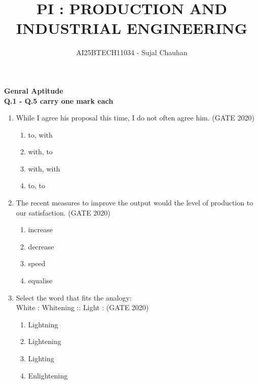 \documentclass[journal,12pt,onecolumn]{IEEEtran}
\theoremstyle{remark}
\begin{document}
\title{PI : PRODUCTION AND INDUSTRIAL ENGINEERING}
\author{AI25BTECH11034 - Sujal Chauhan}
\maketitle
\renewcommand{\thefigure}{\theenumi}
\renewcommand{\thetable}{\theenumi}
\textbf{\Large Genral Aptitude } \\
\vspace{1cm}
\textbf{\large Q.1 - Q.5 carry one mark each}
\begin{enumerate}
\item While I agree \underline{\hspace{2cm}} his proposal this time, I do not often agree  him.
\hfill{(GATE 2020)}
\begin{multicols}{4}
\begin{enumerate}
    \item to, with
    \item with, to
    \item with, with
    \item to, to
\end{enumerate}
\end{multicols}
\vspace{1cm}

\item The recent measures to improve the output would \underline{\hspace{2cm}}the level of production to our satisfaction.
\hfill{(GATE 2020)}
\begin{multicols}{4}
\begin{enumerate}
    \item increase
    \item decrease
    \item speed
    \item equalise
\end{enumerate}
\end{multicols}
\vspace{1cm}

\item Select the word that fits the analogy: \\
White : Whitening :: Light : \underline{\hspace{2cm}}  
\hfill{(GATE 2020)}
\begin{enumerate}
    \item Lightning
    \item Lightening
    \item Lighting
    \item Enlightening
\end{enumerate}
\vspace{1cm}


\end{enumerate}
\end{document}
